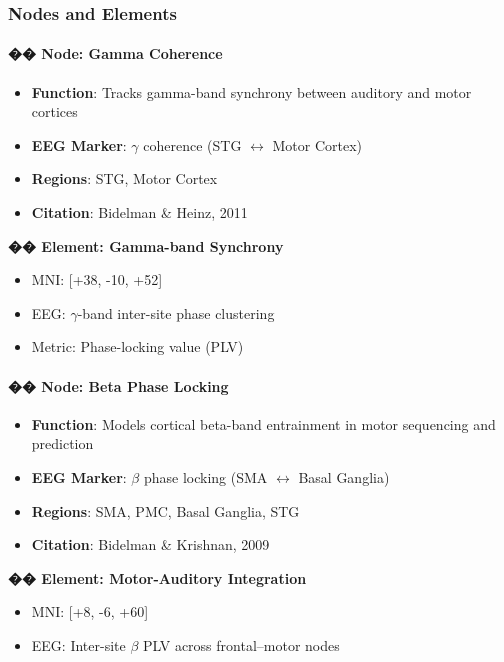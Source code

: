 \subsubsection*{Nodes and Elements}

\paragraph{�� Node: Gamma Coherence}

\begin{itemize}
    \item \textbf{Function}: Tracks gamma-band synchrony between auditory and motor cortices
    \item \textbf{EEG Marker}: $\gamma$ coherence (STG $\leftrightarrow$ Motor Cortex)
    \item \textbf{Regions}: STG, Motor Cortex
    \item \textbf{Citation}: Bidelman \& Heinz, 2011
\end{itemize}

\textbf{�� Element: Gamma-band Synchrony}

\begin{itemize}
    \item MNI: [+38, -10, +52]
    \item EEG: $\gamma$-band inter-site phase clustering
    \item Metric: Phase-locking value (PLV)
\end{itemize}

\paragraph{�� Node: Beta Phase Locking}

\begin{itemize}
    \item \textbf{Function}: Models cortical beta-band entrainment in motor sequencing and prediction
    \item \textbf{EEG Marker}: $\beta$ phase locking (SMA $\leftrightarrow$ Basal Ganglia)
    \item \textbf{Regions}: SMA, PMC, Basal Ganglia, STG
    \item \textbf{Citation}: Bidelman \& Krishnan, 2009
\end{itemize}

\textbf{�� Element: Motor-Auditory Integration}

\begin{itemize}
    \item MNI: [+8, -6, +60]
    \item EEG: Inter-site $\beta$ PLV across frontal–motor nodes
\end{itemize}

